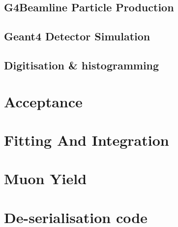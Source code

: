 \documentclass[]{article}
\begin{document}
\subsection{G4Beamline Particle Production} %
\label{sub:g4bl_particle_production}

\subsection{Geant4 Detector Simulation} %
\label{sub:geant4_detector_simulation}

\subsection{Digitisation & histogramming} %
\label{sub:digitisation_histogramming}

\section{Acceptance} %
\label{sec:acceptance}

\section{Fitting And Integration} %
\label{sec:fitting_and_integration}

\section{Muon Yield} %
\label{sec:muon_yield}

\appendix
\section{De-serialisation code} %
\label{app:deserialisation}
\end{document}
